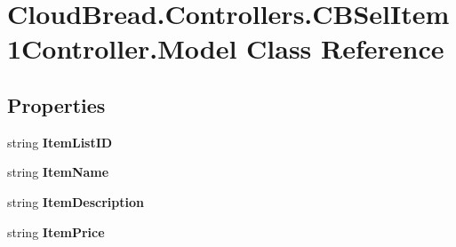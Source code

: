 \hypertarget{class_cloud_bread_1_1_controllers_1_1_c_b_sel_item1_controller_1_1_model}{}\section{Cloud\+Bread.\+Controllers.\+C\+B\+Sel\+Item1\+Controller.\+Model Class Reference}
\label{class_cloud_bread_1_1_controllers_1_1_c_b_sel_item1_controller_1_1_model}
\subsection*{Properties}
\begin{DoxyCompactItemize}
\item 
string {\bfseries Item\+List\+ID}\hypertarget{class_cloud_bread_1_1_controllers_1_1_c_b_sel_item1_controller_1_1_model_a3077af92ea1e1989d033ac123c80d1f1}{}\label{class_cloud_bread_1_1_controllers_1_1_c_b_sel_item1_controller_1_1_model_a3077af92ea1e1989d033ac123c80d1f1}

\item 
string {\bfseries Item\+Name}\hypertarget{class_cloud_bread_1_1_controllers_1_1_c_b_sel_item1_controller_1_1_model_a93d2656d316ad42916ea68f1f87e0d25}{}\label{class_cloud_bread_1_1_controllers_1_1_c_b_sel_item1_controller_1_1_model_a93d2656d316ad42916ea68f1f87e0d25}

\item 
string {\bfseries Item\+Description}\hypertarget{class_cloud_bread_1_1_controllers_1_1_c_b_sel_item1_controller_1_1_model_a0fb173c920100a961d92167549f37979}{}\label{class_cloud_bread_1_1_controllers_1_1_c_b_sel_item1_controller_1_1_model_a0fb173c920100a961d92167549f37979}

\item 
string {\bfseries Item\+Price}\hypertarget{class_cloud_bread_1_1_controllers_1_1_c_b_sel_item1_controller_1_1_model_a2037acfd02233ebb916984fcbd1174f6}{}\label{class_cloud_bread_1_1_controllers_1_1_c_b_sel_item1_controller_1_1_model_a2037acfd02233ebb916984fcbd1174f6}


\end{DoxyCompactItemize}
